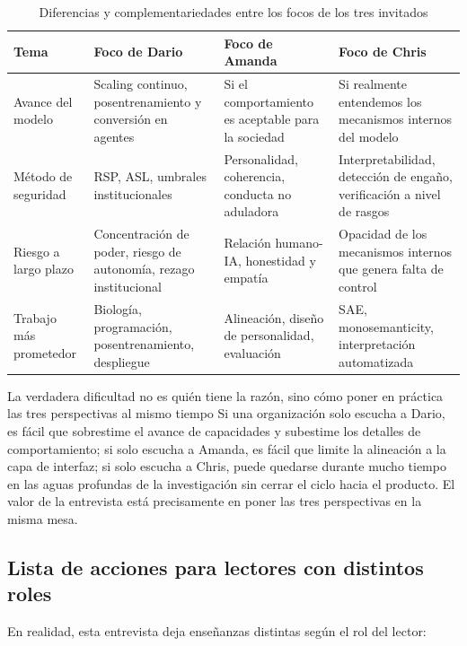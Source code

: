 \documentclass[a4paper]{article}
\begin{document}
\begin{table}[H]
\centering
\begin{tabular}{p{} p{} p{} p{}}
\toprule
Tema & Foco de Dario & Foco de Amanda & Foco de Chris \\
\midrule
Avance del modelo & Scaling continuo, posentrenamiento y conversión en agentes & Si el comportamiento es aceptable para la sociedad & Si realmente entendemos los mecanismos internos del modelo \\
Método de seguridad & RSP, ASL, umbrales institucionales & Personalidad, coherencia, conducta no aduladora & Interpretabilidad, detección de engaño, verificación a nivel de rasgos \\
Riesgo a largo plazo & Concentración de poder, riesgo de autonomía, rezago institucional & Relación humano-IA, honestidad y empatía & Opacidad de los mecanismos internos que genera falta de control \\
Trabajo más prometedor & Biología, programación, posentrenamiento, despliegue & Alineación, diseño de personalidad, evaluación & SAE, monosemanticity, interpretación automatizada \\
\bottomrule
\end{tabular}
\caption{Diferencias y complementariedades entre los focos de los tres invitados}
\end{table}

\begin{knowledgebox}{La verdadera dificultad no es quién tiene la razón, sino cómo poner en práctica las tres perspectivas al mismo tiempo}
Si una organización solo escucha a Dario, es fácil que sobrestime el avance de capacidades y subestime los detalles de comportamiento; si solo escucha a Amanda, es fácil que limite la alineación a la capa de interfaz; si solo escucha a Chris, puede quedarse durante mucho tiempo en las aguas profundas de la investigación sin cerrar el ciclo hacia el producto. El valor de la entrevista está precisamente en poner las tres perspectivas en la misma mesa.
\end{knowledgebox}

\subsection{Lista de acciones para lectores con distintos roles}

En realidad, esta entrevista deja enseñanzas distintas según el rol del lector:
\end{document}
